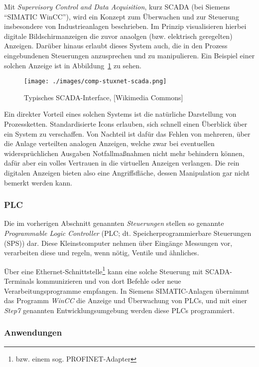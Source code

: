 Mit \emph{Supervisory Control and Data Acquisition}, kurz SCADA (bei
Siemens \enquote{SIMATIC WinCC}), wird ein Konzept zum Überwachen und
zur Steuerung insbesondere von Industrieanlagen beschrieben. Im
Prinzip visualisieren hierbei digitale Bildschirmanzeigen die zuvor
anaolgen (bzw. elektrisch geregelten) Anzeigen. Darüber hinaus erlaubt
dieses System auch, die in den Prozess eingebundenen Steuerungen
anzusprechen und zu manipulieren. Ein Beispiel einer solchen Anzeige
ist in Abbildung~\ref{fig:comp:stuxnet:scada} zu sehen.

\begin{figure}
  \centering
  \texttt{[image: ./images/comp-stuxnet-scada.png]}
  \caption[Typisches SCADA-Interface]
    {Typisches SCADA-Interface, [Wikimedia Commons]}
  \label{fig:comp:stuxnet:scada}
\end{figure}

Ein direkter Vorteil eines solchen Systems ist die natürliche
Darstellung von Prozessketten. Standardisierte Icons erlauben, sich
schnell einen Überblick über ein System zu verschaffen. Von Nachteil
ist dafür das Fehlen von mehreren, über die Anlage verteilten analogen
Anzeigen, welche zwar bei eventuellen widersprüchlichen Ausgaben
Notfallmaßnahmen nicht mehr behindern können, dafür aber ein volles
Vertrauen in die virtuellen Anzeigen verlangen. Die rein digitalen
Anzeigen bieten also eine Angriffsfläche, dessen Manipulation gar
nicht bemerkt werden kann.

\subsubsection{PLC}

Die im vorherigen Abschnitt genannten \emph{Steuerungen} stellen so
genannte \textit{Programmable Logic Controller} (PLC;
dt. Speicherprogrammierbare Steuerungen (SPS)) dar. Diese
Kleinstcomputer nehmen über Eingänge Messungen vor, verarbeiten diese
und regeln, wenn nötig, Ventile und ähnliches.

Über eine Ethernet-Schnittstelle\footnote{bzw. einem
sog. PROFINET-Adapter} kann eine solche Steuerung mit SCADA-Terminals
kommunizieren und von dort Befehle oder neue Verarbeitungsprogramme
empfangen. In Siemens SIMATIC-Anlagen übernimmt das Programm
\emph{WinCC} die Anzeige und Überwachung von PLCs, und mit einer
\emph{Step7} genannten Entwicklungsumgebung werden diese PLCs
programmiert.

\subsubsection{Anwendungen}

